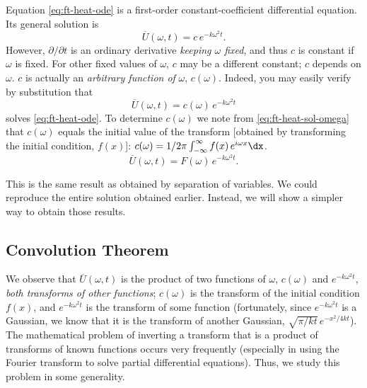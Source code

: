 Equation \eqref{eq:ft-heat-ode} is a first-order constant-coefficient differential equation.  Its general solution is
\[
\overline{U}(\omega,t) = c\,e^{-k\omega^2 t}.
\]
However, $\partial/\partial t$ is an ordinary derivative \textit{keeping $\omega$ fixed}, and thus $c$ is constant if $\omega$ is fixed.  For other fixed values of $\omega$, $c$ may be a different constant; $c$ depends on $\omega$.  $c$ is actually an \textit{arbitrary function of} $\omega$, $c(\omega)$.  Indeed, you may easily verify by substitution that
\begin{equation}
\label{eq:ft-heat-sol-omega}
\overline{U}(\omega,t) = c(\omega)\,e^{-k\omega^2 t}
\end{equation}
solves \eqref{eq:ft-heat-ode}.  To determine $c(\omega)$ we note from \eqref{eq:ft-heat-sol-omega} that $c(\omega)$ equals the initial value of the transform [obtained by transforming the initial condition, $f(x)$]: $c(\omega) = 1/2\pi\int_{-\infty}^{\infty}f(x)\,e^{i\omega x}\dx$.
\begin{equation}
\label{eq:ft-heat-sol-omega-b}
\overline{U}(\omega,t) = F(\omega)\,e^{-k\omega^2 t}.
\end{equation}

This is the same result as obtained by separation of variables.  We could reproduce the entire solution obtained earlier.  Instead, we will show a simpler way to obtain those results.

\subsection{Convolution Theorem}
\label{subsec:convolution}

We observe that $\overline{U}(\omega,t)$ is the product of two functions of $\omega$, $c(\omega)$ and $e^{-k\omega^2 t}$, \textit{both transforms of other functions}; $c(\omega)$ is the transform of the initial condition $f(x)$, and $e^{-k\omega^2 t}$ is the transform of some function (fortunately, since $e^{-k\omega^2 t}$ is a Gaussian, we know that it is the transform of another Gaussian, $\sqrt{\pi/kt}\,e^{-x^2/4kt}$).  The mathematical problem of inverting a transform that is a product of transforms of known functions occurs very frequently (especially in using the Fourier transform to solve partial differential equations).  Thus, we study this problem in some generality.

